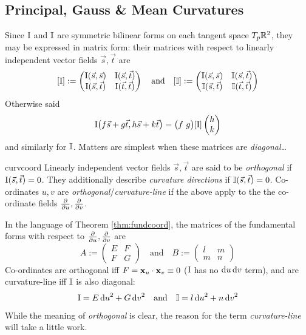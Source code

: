\subsection{Principal, Gauss \& Mean Curvatures}\label{sec:principalcurv}

Since $\mathrm{I}$ and $\mathbb{I}$ are symmetric bilinear forms on each tangent space $T_p\mathbb{R}^2$, they may be expressed in matrix form: their matrices with respect to linearly independent vector fields $\vec s,\vec t$ are
\[
	[\mathrm{I}]:=
	\begin{pmatrix}
  	\mathrm{I}(\vec s,\vec s)&\mathrm{I}(\vec s,\vec t)\\
  	\mathrm{I}(\vec s,\vec t)&\mathrm{I}(\vec t,\vec t)
	\end{pmatrix}
	\quad\text{and}\quad
	[\mathbb{I}]:=
	\begin{pmatrix}
  	\mathbb{I}(\vec s,\vec s)&\mathbb{I}(\vec s,\vec t)\\
  	\mathbb{I}(\vec s,\vec t)&\mathbb{I}(\vec t,\vec t)
	\end{pmatrix}\]
	Otherwise said
	\[
		\mathrm{I}\bigl(f\vec s+g\vec t,h\vec s+k\vec t\bigr)=\bigl(f\ g\bigr)[\mathrm{I}]\begin{pmatrix}h\\k\end{pmatrix}
	\]
	and similarly for $\mathbb{I}$. Matters are simplest when these matrices are \emph{diagonal\ldots}


\begin{defn}{}{curvcoord}
	Linearly independent vector fields $\vec s,\vec t$ are said to be \emph{orthogonal} if $\mathrm{I}(\vec s,\vec t)=0$. They additionally describe \emph{curvature directions} if $\mathbb{I}(\vec s,\vec t)=0$.\smallbreak
	Co-ordinates $u,v$ are \emph{orthogonal}/\emph{curvature-line} if the above apply to the the co-ordinate fields $\frac{\partial }{\partial u},\frac{\partial }{\partial v}$.
\end{defn}

In the language of Theorem \ref{thm:fundcoord}, the matrices of the fundamental forms with respect to $\frac{\partial }{\partial u},\frac{\partial }{\partial v}$ are 
\[
	A:=
	\begin{pmatrix}
  	E&F\\F&G
	\end{pmatrix}
	\quad\text{and}\quad
	B:=
	\begin{pmatrix}
  	l&m\\m&n
	\end{pmatrix}
	\tag{$\ast$}
\]
Co-ordinates are orthogonal iff $F={\mathbf{x}}_u\cdot{\mathbf{x}}_v\equiv 0$ ($\mathrm{I}$ has no ${\mathrm{d} u}\,{\mathrm{d} v}$ term), and are curvature-line iff $\mathbb{I}$ is also diagonal:
\[
	\mathrm{I}=E\,{\mathrm{d} u}^2+G\,{\mathrm{d} v}^2\quad\text{and}\quad \mathbb{I}=l\,{\mathrm{d} u}^2+n\,{\mathrm{d} v}^2
\]
While the meaning of \emph{orthogonal} is clear, the reason for the term \emph{curvature-line} will take a little work.


